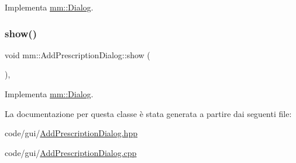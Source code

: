 Implementa \mbox{\hyperlink{classmm_1_1_dialog_abe6e5ac072c12c06971f60491f079d80}{mm\+::\+Dialog}}.

\mbox{\label{classmm_1_1_add_prescription_dialog_aa1c86141b2d45e141684bd99d557b8e4}} 
\subsubsection{\texorpdfstring{show()}{show()}}
{\footnotesize\ttfamily void mm\+::\+Add\+Prescription\+Dialog\+::show (\begin{DoxyParamCaption}{ }\end{DoxyParamCaption})\hspace{0.3cm}{\ttfamily [override]}, {\ttfamily [virtual]}}



Implementa \mbox{\hyperlink{classmm_1_1_dialog_afda4b0dc7c0ac027c4b8fdb95713700f}{mm\+::\+Dialog}}.



La documentazione per questa classe è stata generata a partire dai seguenti file\+:\begin{DoxyCompactItemize}
\item 
code/gui/\mbox{\hyperlink{_add_prescription_dialog_8hpp}{Add\+Prescription\+Dialog.\+hpp}}\item 
code/gui/\mbox{\hyperlink{_add_prescription_dialog_8cpp}{Add\+Prescription\+Dialog.\+cpp}}\end{DoxyCompactItemize}
